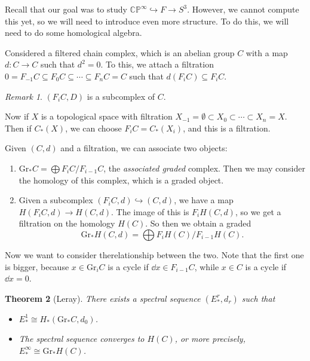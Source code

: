 \documentclass[leqno, openany]{memoir}
\newtheorem{thm}{Theorem}[section]
\theoremstyle{definition}
\theoremstyle{remark}
\newtheorem{rmk}[thm]{Remark}
\theoremstyle{plain}
\theoremstyle{definition}
\theoremstyle{remark}
\newcommand{\C}{\mathbb{C}}
\renewcommand{\P}{\mathbb{P}}
\newcommand{\mr}[1]{\mathrm{#1}}
\begin{document}
Recall that our goal was to study $\C\P^{\infty} \hookrightarrow F \to S^3$. However, we cannot compute this yet, so we will need to introduce even more structure. To do this, we will need to do some homological algebra.

Considered a filtered chain complex, which is an abelian group $C$ with a map $d \colon C \to C$ such that $d^2 = 0$. To this, we attach a filtration $0 = F_{-1} C \subseteq F_0 C \subseteq \cdots \subseteq F_n C = C$ such that $d(F_i C) \subseteq F_i C$.

\begin{rmk}
    $(F_i C, D)$ is a subcomplex of $C$.
\end{rmk}

Now if $X$ is a topological space with filtration $X_{-1} = \emptyset \subset X_0 \subset \cdots \subset X_n = X$. Then if $C_*(X)$, we can choose $F_i C = C_*(X_i)$, and this is a filtration.

Given $(C,d)$ and a filtration, we can associate two objects:
\begin{enumerate}
    \item $\mr{Gr}_* C = \bigoplus F_i C / F_{i-1} C$, the \textit{associated graded} complex. Then we may consider the homology of this complex, which is a graded object.
    \item Given a subcomplex $(F_i C, d) \hookrightarrow (C,d)$, we have a map $H(F_i C, d) \to H(C, d)$. The image of this is $F_i H(C,d)$, so we get a filtration on the homology $H(C)$. So then we obtain a graded
        \[ \mr{Gr}_* H(C,d) = \bigoplus F_i H(C) / F_{i-1} H(C). \]
\end{enumerate}
Now we want to consider therelationship between the two. Note that the first one is bigger, because $x \in \mr{Gr}_i C$ is a cycle if $\dd{x} \in F_{i-1} C$, while $x \in C$ is a cycle if $\dd{x} = 0$.

\begin{thm}[Leray]
    There exists a spectral sequence $(E_*^r, d_r)$ such that
    \begin{itemize}
        \item $E_*^1 \cong H_* (\mr{Gr}_* C, d_0)$.
        \item The spectral sequence converges to $H(C)$, or more precisely, $E_*^{\infty} \cong \mr{Gr}_* H(C)$.
    \end{itemize}
\end{thm}
\end{document}
